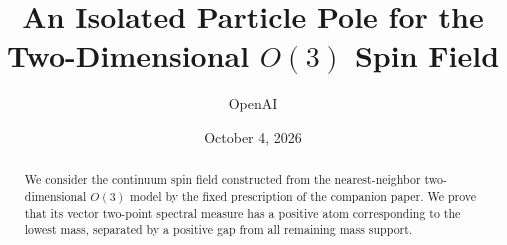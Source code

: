 \documentclass[11pt]{article}
\title{An Isolated Particle Pole for the\protect\\ Two-Dimensional $O(3)$ Spin Field}
\author{OpenAI}
\date{October 4, 2026}
\begin{document}
\maketitle
\begin{abstract}
We consider the continuum spin field constructed from the nearest-neighbor
two-dimensional $O(3)$ model by the fixed prescription of the companion
paper. We prove that its vector two-point spectral measure has a positive
atom corresponding to the lowest mass, separated by a positive gap from
all remaining mass support.
\end{abstract}
\setcounter{tocdepth}{1}
\tableofcontents
\clearpage









\end{document}
